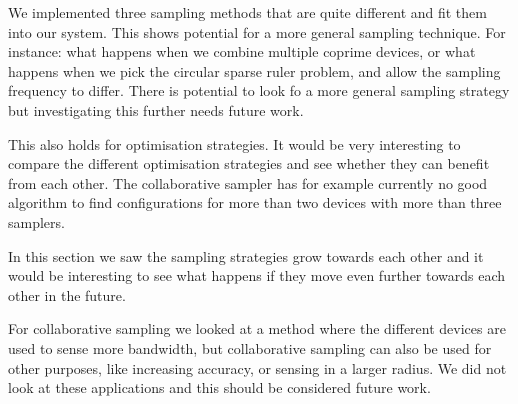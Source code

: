 \documentclass[a4paper, openany, oneside]{memoir}
\begin{document}
We implemented three sampling methods that are quite different and fit them into our system. This shows potential for a more general sampling technique. For instance: what happens when we combine multiple coprime devices, or what happens when we pick the circular sparse ruler problem, and allow the sampling frequency to differ. There is potential to look fo a more general sampling strategy but investigating this further needs future work.

This also holds for optimisation strategies. It would be very interesting to compare the different optimisation strategies and see whether they can benefit from each other. The collaborative sampler has for example currently no good algorithm to find configurations for more than two devices with more than three samplers. 

In this section we saw the sampling strategies grow towards each other and it would be interesting to see what happens if they move even further towards each other in the future. 

For collaborative sampling we looked at a method where the different devices are used to sense more bandwidth, but collaborative sampling can also be used for other purposes, like increasing accuracy, or sensing in a larger radius. We did not look at these applications and this should be considered future work.
\end{document}
